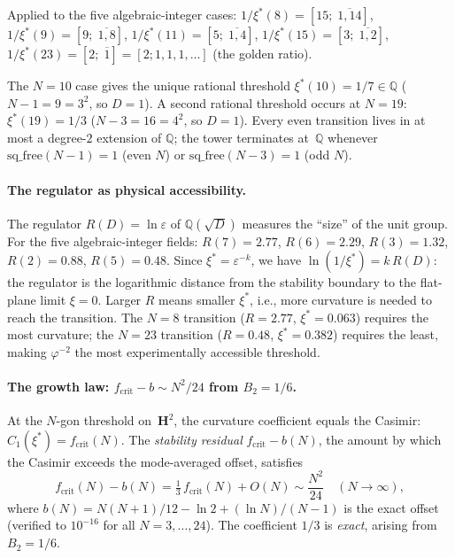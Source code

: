 Applied to the five algebraic-integer cases:
$1/\xi^*(8) = [15;\;\overline{1, 14}]$,
$1/\xi^*(9) = [9;\;\overline{1, 8}]$,
$1/\xi^*(11) = [5;\;\overline{1, 4}]$,
$1/\xi^*(15) = [3;\;\overline{1, 2}]$,
$1/\xi^*(23) = [2;\;\overline{1}] = [2; 1, 1, 1, \ldots]$
(the golden ratio).

The $N = 10$ case gives the unique rational threshold
$\xi^*(10) = 1/7 \in \mathbb{Q}$
($N{-}1 = 9 = 3^2$, so $D = 1$).  A second rational threshold
occurs at $N = 19$: $\xi^*(19) = 1/3$
($N{-}3 = 16 = 4^2$, so $D = 1$).  Every even transition lives
in at most a degree-$2$ extension of $\mathbb{Q}$; the tower
terminates at~$\mathbb{Q}$ whenever
$\mathrm{sq\_free}(N{-}1) = 1$ (even $N$) or
$\mathrm{sq\_free}(N{-}3) = 1$ (odd $N$).

\paragraph{The regulator as physical accessibility.}
The regulator $R(D) = \ln\varepsilon$ of $\mathbb{Q}(\sqrt{D})$
measures the ``size'' of the unit group.  For the five
algebraic-integer fields:
$R(7) = 2.77$, $R(6) = 2.29$, $R(3) = 1.32$, $R(2) = 0.88$,
$R(5) = 0.48$.
Since $\xi^* = \varepsilon^{-k}$, we have
$\ln(1/\xi^*) = k\,R(D)$: the regulator is the logarithmic
distance from the stability boundary to the flat-plane limit
$\xi = 0$.  Larger $R$ means smaller $\xi^*$, i.e., more
curvature is needed to reach the transition.
The $N = 8$ transition ($R = 2.77$, $\xi^* = 0.063$) requires
the most curvature; the $N = 23$ transition ($R = 0.48$,
$\xi^* = 0.382$) requires the least, making
$\varphi^{-2}$ the most experimentally accessible threshold.

\paragraph{The growth law: $f_{\mathrm{crit}} - b \sim N^2/24$ from $B_2 = 1/6$.}
At the $N$-gon threshold on~$\mathbf{H}^2$, the curvature
coefficient equals the Casimir: $C_1(\xi^*) = f_{\mathrm{crit}}(N)$.
The \emph{stability residual} $f_{\mathrm{crit}} - b(N)$, the amount
by which the Casimir exceeds the mode-averaged offset, satisfies
\begin{equation}\label{eq:growth-law}
  f_{\mathrm{crit}}(N) - b(N)
  = \tfrac{1}{3}\,f_{\mathrm{crit}}(N) + O(N)
  \sim \frac{N^2}{24} \quad (N \to \infty),
\end{equation}
where $b(N) = N(N{+}1)/12 - \ln 2 + (\ln N)/(N{-}1)$
is the exact offset (verified to $10^{-16}$ for all $N = 3,\ldots,24$).
The coefficient $1/3$ is \emph{exact}, arising from $B_2 = 1/6$.

